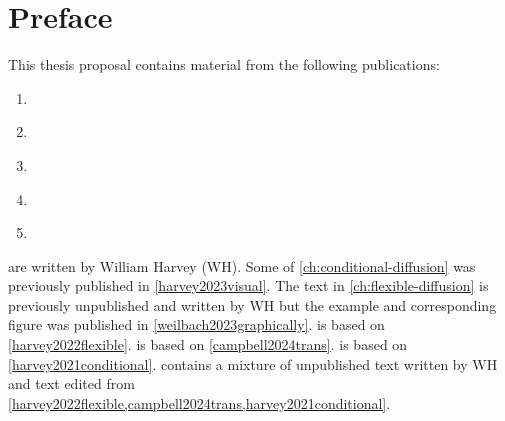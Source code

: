
\chapter{Preface}

This thesis proposal contains material from the following publications:
\begin{enumerate}
    \item {} \label{harvey2023visual}
    \item {} \label{weilbach2023graphically}
    \item {} \label{harvey2022flexible}
    \item {} \label{campbell2024trans}
    \item {} \label{harvey2021conditional}
\end{enumerate}
 are written by William Harvey (WH). Some of \cref{ch:conditional-diffusion} was previously published in \cref{harvey2023visual}. The text in \cref{ch:flexible-diffusion} is previously unpublished and written by WH but the example and corresponding figure was published in \cref{weilbach2023graphically}.  is based on \cref{harvey2022flexible}.  is based on \cref{campbell2024trans}.  is based on \cref{harvey2021conditional}.  contains a mixture of unpublished text written by WH and text edited from \cref{harvey2022flexible,campbell2024trans,harvey2021conditional}.

